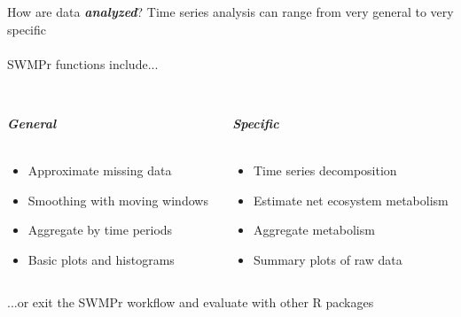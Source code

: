 \documentclass[serif]{beamer}\usepackage[]{graphicx}\usepackage[]{color}
\newcommand{\Bigtxt}[1]{\textbf{\textit{#1}}}
\begin{document}
\begin{frame}{How are data \Bigtxt{analyzed}?}
Time series analysis can range from very general to very specific \\~\\
SWMPr functions include...\\~\\
\begin{columns}[t]
\begin{column}{0.45\textwidth}
\Bigtxt{General} \\~\\
\begin{itemize}
\item Approximate missing data
\item Smoothing with moving windows
\item Aggregate by time periods
\item Basic plots and histograms
\end{itemize}
\end{column}
\begin{column}{0.45\textwidth}
\Bigtxt{Specific} \\~\\
\begin{itemize}
\item Time series decomposition
\item Estimate net ecosystem metabolism
\item Aggregate metabolism
\item Summary plots of raw data
\end{itemize}
\end{column}
\end{columns}
\vspace{0.3in}
...or exit the SWMPr workflow and evaluate with other R packages
\end{frame}
\end{document}
